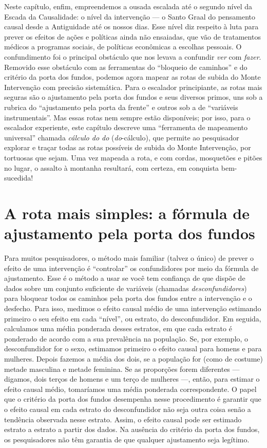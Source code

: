 \documentclass[11pt,a5paper,twoside]{book}
\begin{document}
Neste capítulo, enfim, empreendemos a ousada escalada até o segundo nível da Escada da Causalidade: o nível da intervenção — o Santo Graal do pensamento causal desde a Antiguidade até os nossos dias. Esse nível diz respeito à luta para prever os efeitos de ações e políticas ainda não ensaiadas, que vão de tratamentos médicos a programas sociais, de políticas econômicas a escolhas pessoais. O confundimento foi o principal obstáculo que nos levava a confundir \textit{ver} com \textit{fazer}. Removido esse obstáculo com as ferramentas do “bloqueio de caminhos” e do critério da porta dos fundos, podemos agora mapear as rotas de subida do Monte Intervenção com precisão sistemática. Para o escalador principiante, as rotas mais seguras são o ajustamento pela porta dos fundos e seus diversos primos, uns sob a rubrica do “ajustamento pela porta da frente” e outros sob a de “variáveis instrumentais”. Mas essas rotas nem sempre estão disponíveis; por isso, para o escalador experiente, este capítulo descreve uma “ferramenta de mapeamento universal” chamada \textit{cálculo do do} (\textit{do}-cálculo), que permite ao pesquisador explorar e traçar todas as rotas possíveis de subida do Monte Intervenção, por tortuosas que sejam. Uma vez mapeada a rota, e com cordas, mosquetões e pitões no lugar, o assalto à montanha resultará, com certeza, em conquista bem-sucedida!

\section{A rota mais simples: a fórmula de ajustamento pela porta dos fundos}
Para muitos pesquisadores, o método mais familiar (talvez o único) de prever o efeito de uma intervenção é “controlar” os confundidores por meio da fórmula de ajustamento. Esse é o método a usar se você tem confiança de que dispõe de dados sobre um conjunto suficiente de variáveis (chamadas \textit{desconfundidores}) para bloquear todos os caminhos pela porta dos fundos entre a intervenção e o desfecho. Para isso, medimos o efeito causal médio de uma intervenção estimando primeiro o seu efeito em cada “nível”, ou estrato, do desconfundidor. Em seguida, calculamos uma média ponderada desses estratos, em que cada estrato é ponderado de acordo com a sua prevalência na população. Se, por exemplo, o desconfundidor for o sexo, estimamos primeiro o efeito causal para homens e para mulheres. Depois fazemos a média dos dois, se a população for (como de costume) metade masculina e metade feminina. Se as proporções forem diferentes — digamos, dois terços de homens e um terço de mulheres —, então, para estimar o efeito causal médio, tomaríamos uma média ponderada correspondente. O papel que o critério da porta dos fundos desempenha nesse procedimento é garantir que o efeito causal em cada estrato do desconfundidor não seja outra coisa senão a tendência observada nesse estrato. Assim, o efeito causal pode ser estimado estrato a estrato a partir dos dados. Na ausência do critério da porta dos fundos, os pesquisadores não têm garantia de que qualquer ajustamento seja legítimo.
\end{document}
